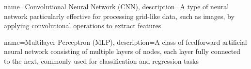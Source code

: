 
{
    name={Convolutional Neural Network (CNN)},
    description={A type of neural network particularly effective for processing grid-like data, such as images, by applying convolutional operations to extract features}
}

{
    name={Multilayer Perceptron (MLP)},
    description={A class of feedforward artificial neural network consisting of multiple layers of nodes, each layer fully connected to the next, commonly used for classification and regression tasks}
}

